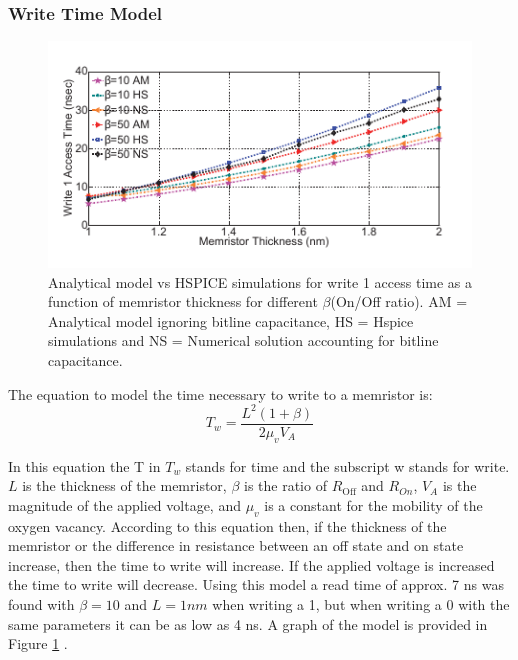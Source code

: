\documentclass{sig-alternate}
\begin{document}
\subsubsection{Write Time Model}
\begin{figure}
  \includegraphics[scale=1.2]{writetime.pdf}
  \caption{Analytical model vs HSPICE simulations for write 1
access time as a function of memristor thickness for different
$\beta$(On/Off ratio). AM = Analytical model ignoring bitline capacitance,
HS = Hspice simulations and NS = Numerical solution
accounting for bitline capacitance.}
  \label{fig:writeTime}
\end{figure}
The equation to model the time necessary to write to a memristor is:
\begin{equation*}
T_{w} = \frac{L^2 (1 + \beta)}{2 \mu _{v} V_{A}}
\end{equation*}

In this equation the T in $T_{w}$ stands for time and the subscript w stands for write.  $L$ is the thickness of the memristor, $\beta$ is the ratio of $R_{\textrm{Off}}$ and $R_{On}$, $V_{A}$ is the magnitude of the applied voltage, and $\mu _{v}$ is a constant for the mobility of the oxygen vacancy.  According to this equation then, if the thickness of the memristor or the difference in resistance between an off state and on state increase, then the time to write will increase.  If the applied voltage is increased the time to write will decrease.  Using this model a read time of approx. 7 ns was found with $\beta = 10$ and $L = 1 nm$ when writing a 1, but when writing a 0 with the same parameters it can be as low as 4 ns. A graph of the model is provided in Figure \ref{fig:writeTime} \cite{Zangeneh:2012:PEM:2206781.2206786}.

\end{document}

